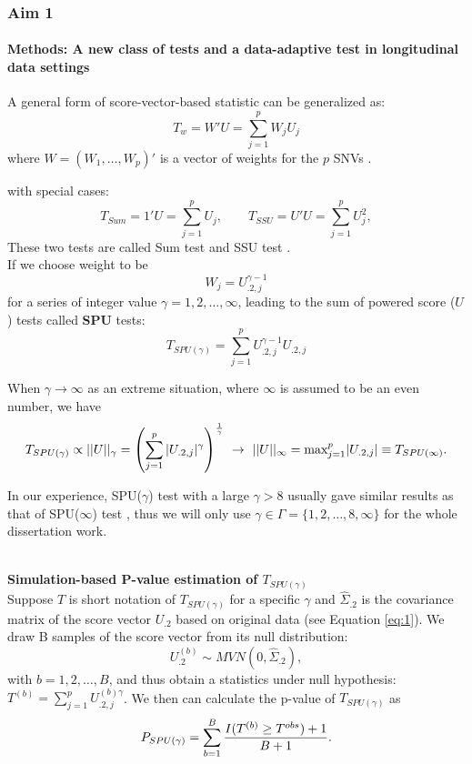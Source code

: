 \documentclass[compress]{beamer}
\begin{document}
\begin{frame}[allowframebreaks]
\frametitle{Aim 1}
\framesubtitle{Methods: A new class of tests and a data-adaptive test in longitudinal data settings}
\scriptsize
A general form of score-vector-based statistic can be generalized as:
$$
T_w = W' U = \sum_{j=1}^p W_j U_j
$$
where $W = (W_1, \ldots, W_p)'$ is a vector of weights for the $p$ SNVs \cite{Lin2011}. 

with special cases:
$$
T_{Sum} = 1' U = \sum_{j=1}^p U_j, \qquad T_{SSU} = U'U = \sum_{j=1}^p U_j^2,
$$
These two tests are called Sum test and SSU test \cite{Pan2009}. \\


\framebreak
If we choose weight to be
$$W_j = U_{.2, j} ^ { \gamma - 1} $$
for a series of integer value $\gamma = 1,2,\ldots,\infty$, leading to the sum of powered score ($U$) tests called \textbf{SPU} tests:
$$
T_{ SPU ( \gamma ) } = \sum_{j=1}^p U_{.2, j} ^ { \gamma - 1} U_{.2, j}
$$

When $\gamma \rightarrow \infty$ as an extreme situation, where $\infty$ is assumed to be an even number, we have
$$
T_{ SPU(\gamma) } \propto ||U||_{\gamma} = \left( \sum_{j=1}^p |U_{.2, j}| ^ { \gamma } \right) ^ { 1 \over \gamma } \ \rightarrow \ ||U||_{\infty} = \textrm{max}_{j=1} ^ p |U_{.2, j}| \equiv T_{ SPU(\infty) }.
$$ 

In our experience, SPU($\gamma$) test with a large $\gamma > 8$ usually gave similar results as that of SPU($\infty$) test \cite{pan2014powerful}, thus we will only use $\gamma \in \Gamma = \{1,2,\ldots,8,\infty \} $ for the whole dissertation work. \\\

\framebreak
\textbf{Simulation-based P-value estimation of $T_{ SPU(\gamma) }$ }\\

Suppose $T$ is short notation of $T_{ SPU(\gamma) }$ for a specific $\gamma$ and $\hat{\Sigma}_{.2}$ is the covariance matrix of the score vector $U_{.2}$ based on original data (see Equation \ref{eq:1}). We draw B samples of the score vector from its null distribution: 
$$U_{.2}^{ (b) } \sim MVN \left( 0, \hat{\Sigma}_{.2} \right),$$ 
with $b = 1,2,\ldots,B$, and thus obtain a statistics under null hypothesis: $T ^ {(b)} = \sum_{j=1}^p U^{ (b)\gamma }_{.2, j} $. We then can calculate the p-value of $T_{ SPU(\gamma) }$ as 
$$P_{ SPU(\gamma) } = \sum_{b=1}^B { I(T^{(b)} \geq T ^ {obs} ) + 1  \over B + 1 }. $$



\end{frame}
\end{document}
